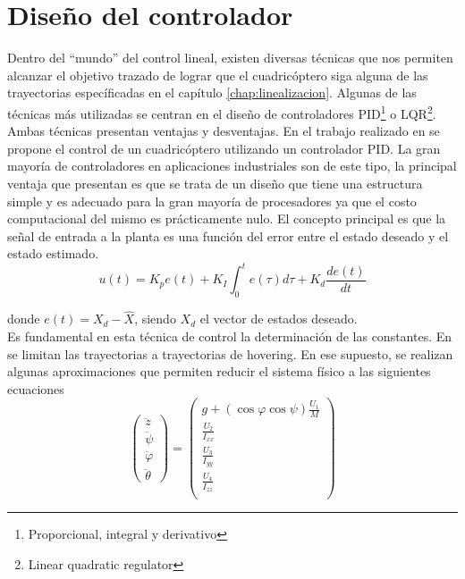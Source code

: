 \documentclass[main]{subfiles}
\begin{document}
\chapter{Diseño del controlador}
\label{chap:control}

Dentro del ``mundo'' del control lineal, existen diversas t\'ecnicas que nos permiten alcanzar el objetivo trazado de lograr que el cuadric\'optero siga alguna de las trayectorias espec\'ificadas en el cap\'itulo \ref{chap:linealizacion}. Algunas de las t\'ecnicas m\'as utilizadas se centran en el diseño de controladores PID\footnote{Proporcional, integral y derivativo} o LQR\footnote{Linear quadratic regulator}. Ambas t\'ecnicas presentan ventajas y desventajas. En el trabajo realizado en \cite{bib:quadrotor-bible} se propone el control de un cuadric\'optero utilizando un controlador PID. La gran mayor\'ia de controladores en aplicaciones industriales son de este tipo, la principal ventaja que presentan es que se trata de un diseño que tiene una estructura simple y es adecuado para la gran mayor\'ia de procesadores ya que el costo computacional del mismo es pr\'acticamente nulo. El concepto principal es que la señal de entrada a la planta es una funci\'on del error entre el estado deseado y el estado estimado.
\begin{equation}
u(t) = K_pe(t)+K_I\int_0^t e(\tau) d\tau +K_d\frac{de(t)}{dt}
\end{equation}

donde $e(t) = X_d-\hat{X}$, siendo $X_d$ el vector de estados deseado.\\

Es fundamental en esta t\'ecnica de control la determinaci\'on de las constantes. En \cite{bib:quadrotor-bible} se limitan las trayectorias a trayectorias de hovering. En ese supuesto, se realizan algunas aproximaciones que permiten reducir el sistema f\'isico a las siguientes ecuaciones
\begin{equation}
\left(
\begin{array}{c}
\ddot{z}\\
\ddot{\psi}\\
\ddot{\varphi} \\
\ddot{\theta}
\end{array}\right)
=\left(\begin{array}{c}
g+(\cos\varphi\cos\psi)\frac{U_1}{M}\\
 \frac{U_2}{I_{xx}} \\
 \frac{U_3}{I_{yy}} \\
 \frac{U_4}{I_{zz}} \\
\end{array}\right)
\end{equation}
\end{document}
